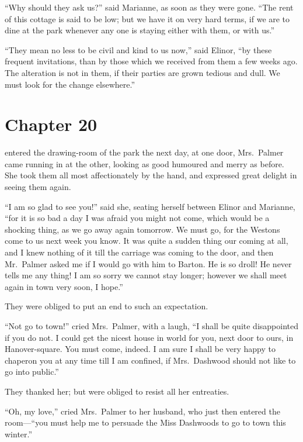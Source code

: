 ``Why should they ask us?'' said Marianne, as soon as they
were gone.  ``The rent of this cottage is said to be low;
but we have it on very hard terms, if we are to dine
at the park whenever any one is staying either with them,
or with us.''

``They mean no less to be civil and kind to us now,''
said Elinor, ``by these frequent invitations, than by
those which we received from them a few weeks ago.
The alteration is not in them, if their parties are grown
tedious and dull.  We must look for the change elsewhere.''



\chapter{Chapter 20}


 entered the drawing-room of the park
the next day, at one door, Mrs.\ Palmer came running in at
the other, looking as good humoured and merry as before.
She took them all most affectionately by the hand,
and expressed great delight in seeing them again.

``I am so glad to see you!'' said she, seating herself
between Elinor and Marianne, ``for it is so bad a day I was
afraid you might not come, which would be a shocking thing,
as we go away again tomorrow. We must go, for the Westons
come to us next week you know.  It was quite a sudden thing
our coming at all, and I knew nothing of it till the carriage
was coming to the door, and then Mr.\ Palmer asked me if I
would go with him to Barton.  He is so droll! He never
tells me any thing! I am so sorry we cannot stay longer;
however we shall meet again in town very soon, I hope.''

They were obliged to put an end to such an expectation.

``Not go to town!'' cried Mrs.\ Palmer, with a laugh,
``I shall be quite disappointed if you do not.  I could
get the nicest house in world for you, next door to ours,
in Hanover-square.  You must come, indeed.  I am sure
I shall be very happy to chaperon you at any time till
I am confined, if Mrs.\ Dashwood should not like to go
into public.''

They thanked her; but were obliged to resist all
her entreaties.

``Oh, my love,'' cried Mrs.\ Palmer to her husband,
who just then entered the room---``you must help me to
persuade the Miss Dashwoods to go to town this winter.''

